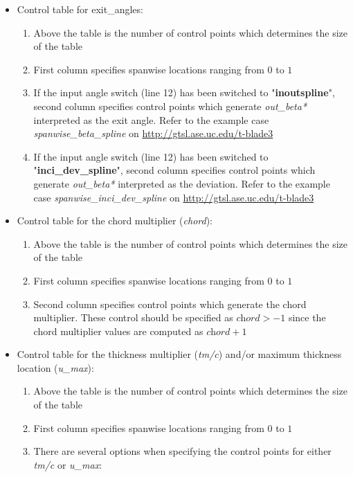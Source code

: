 \documentclass[8pt]{article}
\begin{document}
\begin{itemize}[leftmargin=*]
\begin{enumerate}[label=\alph*]
    \end{enumerate}
    \item Control table for exit\_angles:
    \begin{enumerate}[label=\alph*]
        \item Above the table is the number of control points which determines the size of the table
        \item First column specifies spanwise locations ranging from $0$ to $1$
        \item If the input angle switch (line 12) has been switched to "\textbf{inoutspline}", second column specifies control points which generate \textit{out\_beta*} interpreted as the exit angle. Refer to the example case \textit{spanwise\_beta\_spline} on \url{http://gtsl.ase.uc.edu/t-blade3}
        \item If the input angle switch (line 12) has been switched to "\textbf{inci\_dev\_spline}", second column specifies control points which generate \textit{out\_beta*} interpreted as the deviation. Refer to the example case \textit{spanwise\_inci\_dev\_spline} on \url{http://gtsl.ase.uc.edu/t-blade3}
    \end{enumerate}
    \item Control table for the chord multiplier (\textit{chord}):
    \begin{enumerate}[label=\alph*]
        \item Above the table is the number of control points which determines the size of the table
        \item First column specifies spanwise locations ranging from $0$ to $1$
        \item Second column specifies control points which generate the chord multiplier. These control should be specified as $\textit{chord} > -1$ since the chord multiplier values are computed as $\textit{chord} + 1$ 
    \end{enumerate}
    \item Control table for the thickness multiplier (\textit{tm/c}) and/or maximum thickness location (\textit{u\_max}):
    \begin{enumerate}[label=\alph*]
        \item Above the table is the number of control points which determines the size of the table
        \item First column specifies spanwise locations ranging from $0$ to $1$
        \item There are several options when specifying the control points for either \textit{tm/c} or \textit{u\_max}:

\end{enumerate}
\end{itemize}
\end{document}
